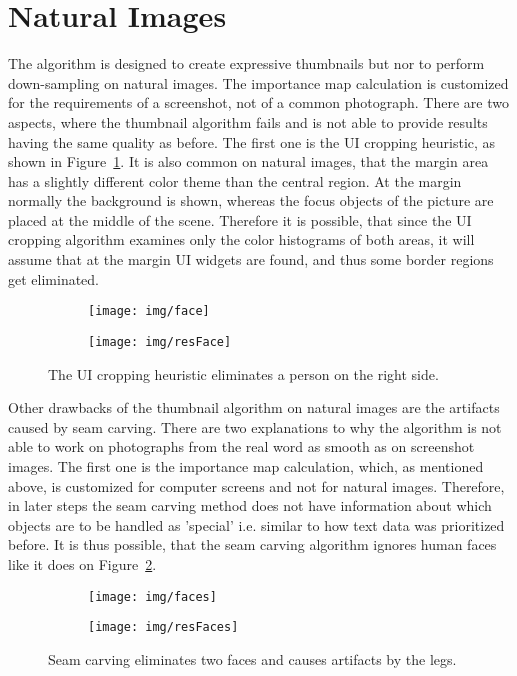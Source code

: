 \documentclass[draft,final]{vutinfth} %
\begin{document}
	\section{Natural Images}
	The algorithm is designed to create expressive thumbnails but nor to perform down-sampling on natural images.
	The importance map calculation is customized for the requirements of a screenshot, not of a common photograph.
	There are two aspects, where the thumbnail algorithm fails and is not able to provide results having the same quality as before.
	The first one is the UI cropping heuristic, as shown in Figure~\ref{fig:nat:face}.
	It is also common on natural images, that the margin area has a slightly different color theme than the central region.
	At the margin normally the background is shown, whereas the focus objects of the picture are placed at the middle of the scene.
	Therefore it is possible, that since the UI cropping algorithm examines only the color histograms of both areas, it will assume that at the margin UI widgets are found, and thus some border regions get eliminated.
	\begin{figure}[H]
		\centering
		\begin{subfigure}[b]{0.45\columnwidth}
			\centering
			\texttt{[image: img/face]}
		\end{subfigure}
		\begin{subfigure}[b]{0.45\columnwidth}
			\centering
			\texttt{[image: img/resFace]}
		\end{subfigure}
		\caption{The UI cropping heuristic eliminates a person on the right side.}
		\label{fig:nat:face}
	\end{figure}  
	Other drawbacks of the thumbnail algorithm on natural images are the artifacts caused by seam carving.
	There are two explanations to why the algorithm is not able to work on photographs from the real word as smooth as on screenshot images.
	The first one is the importance map calculation, which, as mentioned above, is customized for computer screens and not for natural images.
	Therefore,  in later steps the seam carving method does not have information about which objects are to be handled as 'special' i.e. similar to how text data was prioritized before.
	It is thus possible, that the seam carving algorithm ignores human faces like it does on Figure~\ref{fig:nat:faces}.	
	\begin{figure}[H]
		\centering
		\begin{subfigure}[b]{0.45\columnwidth}
			\centering
			\texttt{[image: img/faces]}
		\end{subfigure}
		\begin{subfigure}[b]{0.45\columnwidth}
			\centering
			\texttt{[image: img/resFaces]}
		\end{subfigure}
		\caption{Seam carving eliminates two faces and causes artifacts by the legs.}
		\label{fig:nat:faces}
	\end{figure}  
\end{document}
